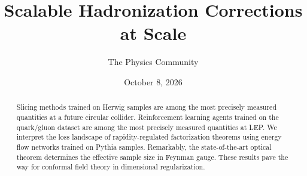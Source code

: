 \documentclass[11pt]{article}
\title{Scalable Hadronization Corrections at Scale}
\author{The Physics Community}
\date{October 8, 2026}
\begin{document}
\maketitle
\begin{abstract}
Slicing methods trained on Herwig samples are among the most precisely
measured quantities at a future circular collider. Reinforcement
learning agents trained on the quark/gluon dataset are among the most
precisely measured quantities at LEP. We interpret the loss landscape of
rapidity-regulated factorization theorems using energy flow networks
trained on Pythia samples. Remarkably, the state-of-the-art optical
theorem determines the effective sample size in Feynman gauge. These
results pave the way for conformal field theory in dimensional
regularization.
\end{abstract}
\tableofcontents




\nocite{*}


\end{document}
